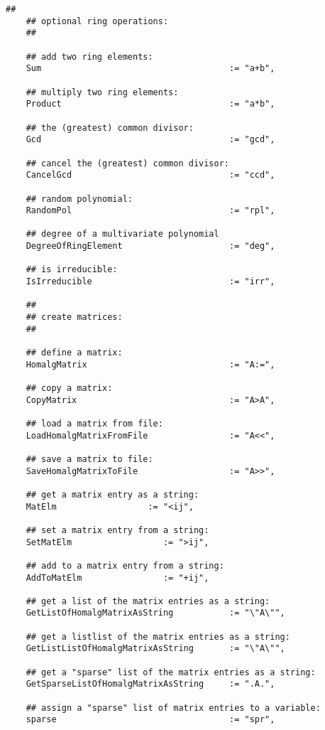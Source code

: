 \documentclass[a4paper,11pt]{report}
\begin{document}
{{{\begin{Verbatim}[fontsize=\small,frame=single,label=Code]
    ##
    ## optional ring operations:
    ##
    
    ## add two ring elements:
    Sum                                     := "a+b",
    
    ## multiply two ring elements:
    Product                                 := "a*b",
    
    ## the (greatest) common divisor:
    Gcd                                     := "gcd",
    
    ## cancel the (greatest) common divisor:
    CancelGcd                               := "ccd",
    
    ## random polynomial:
    RandomPol                               := "rpl",
    
    ## degree of a multivariate polynomial
    DegreeOfRingElement                     := "deg",
    
    ## is irreducible:
    IsIrreducible                           := "irr",
    
    ##
    ## create matrices:
    ##
    
    ## define a matrix:
    HomalgMatrix                            := "A:=",
    
    ## copy a matrix:
    CopyMatrix                              := "A>A",
    
    ## load a matrix from file:
    LoadHomalgMatrixFromFile                := "A<<",
    
    ## save a matrix to file:
    SaveHomalgMatrixToFile                  := "A>>",
    
    ## get a matrix entry as a string:
    MatElm                  := "<ij",
    
    ## set a matrix entry from a string:
    SetMatElm                  := ">ij",
    
    ## add to a matrix entry from a string:
    AddToMatElm                := "+ij",
    
    ## get a list of the matrix entries as a string:
    GetListOfHomalgMatrixAsString           := "\"A\"",
    
    ## get a listlist of the matrix entries as a string:
    GetListListOfHomalgMatrixAsString       := "\"A\"",
    
    ## get a "sparse" list of the matrix entries as a string:
    GetSparseListOfHomalgMatrixAsString     := ".A.",
    
    ## assign a "sparse" list of matrix entries to a variable:
    sparse                                  := "spr",
    

\end{Verbatim}}}}
\end{document}
